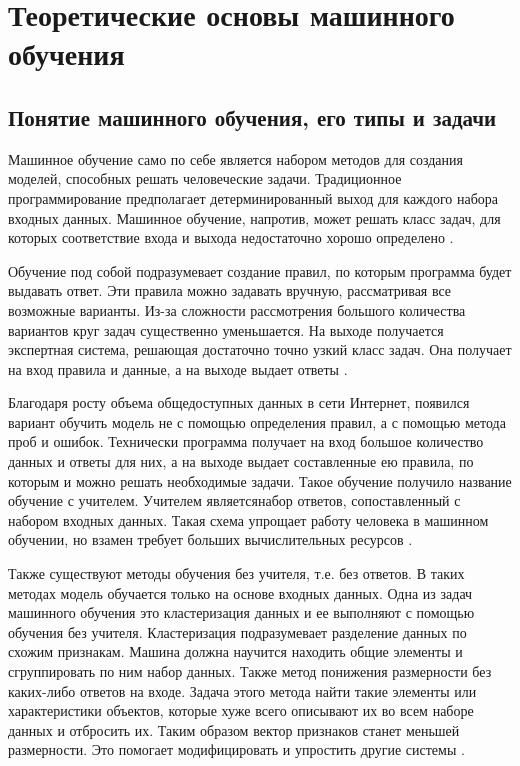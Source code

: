\chapter{Теоретические основы машинного обучения}
\section{Понятие машинного обучения, его типы и задачи}


Машинное обучение само по себе является набором методов для создания моделей, способных решать человеческие задачи. Традиционное программирование предполагает детерминированный выход для каждого набора входных данных. Машинное обучение, напротив, может решать класс задач, для которых соответствие входа и выхода недостаточно хорошо определено \cite{15,22}. 

Обучение под собой подразумевает создание правил, по которым программа будет выдавать ответ. Эти правила можно задавать вручную, рассматривая все возможные варианты. Из-за сложности рассмотрения большого количества вариантов круг задач существенно уменьшается. На выходе получается экспертная система, решающая достаточно точно узкий класс задач. Она получает на вход правила и данные, а на выходе выдает ответы \cite{16,27}.

Благодаря росту объема общедоступных данных в сети Интернет, появился вариант обучить модель не с помощью определения правил, а с помощью метода проб и ошибок. Технически программа получает на вход большое количество данных и ответы для них, а на выходе выдает составленные ею правила, по которым и можно решать необходимые задачи. Такое обучение получило название обучение с учителем. Учителем являетсянабор ответов, сопоставленный с набором входных данных. Такая схема упрощает работу человека в машинном обучении, но взамен требует больших вычислительных ресурсов \cite{13}. 

Также существуют методы обучения без учителя, т.е. без ответов. В таких методах модель обучается только на основе входных данных. Одна из задач машинного обучения это кластеризация данных и ее выполняют с помощью обучения без учителя. Кластеризация подразумевает разделение данных по схожим признакам. Машина должна научится находить общие элементы и сгруппировать по ним набор данных. Также метод понижения размерности без каких-либо ответов на входе. Задача этого метода найти такие элементы или характеристики объектов, которые хуже всего описывают их во всем наборе данных и отбросить их. Таким образом вектор признаков станет меньшей размерности. Это помогает модифицировать и упростить другие системы \cite{12,23}. 

